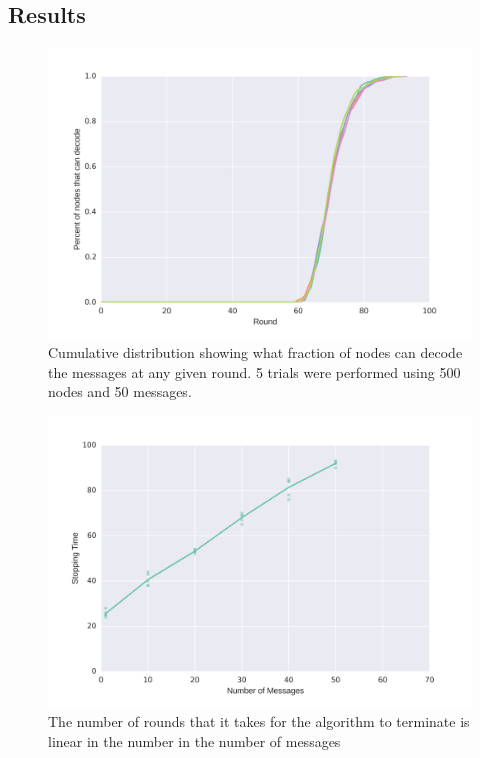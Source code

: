 \documentclass{article} %
\begin{document}
\subsection{Results}
\begin{figure}
\centering
\includegraphics[width=\linewidth]{figures/rlnc-ecdf.png}
\caption{Cumulative distribution showing what fraction of nodes can decode the messages at any given round. 5 trials were performed using 500 nodes and 50 messages.}
\label{fig:rlnc-ecdf}
\end{figure} 
\begin{figure}
\centering
\includegraphics[width=\linewidth]{figures/rlnc-vary-k.png}
\caption{The number of rounds that it takes for the algorithm to terminate is linear in the number in the number of messages}
\label{fig:rlnc-vary-k}
\end{figure} 
\end{document}
